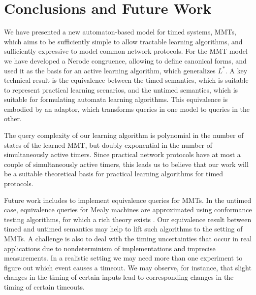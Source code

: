 
\section{Conclusions and Future Work}
\label{conclusions}

We have presented a new automaton-based model for timed systems, MMTs,
which aims to
be sufficiently simple to allow tractable learning algorithms, and sufficiently
expressive to model common network protocols. For the MMT model we have
developed a Nerode congruence, allowing to define canonical forms, and used it
as the basis for an active learning algorithm, which generalizes $L^*$.
A key technical result is the equivalence between the timed semantics,
which is suitable to represent practical learning scenarios, and the
untimed semantics, which is suitable for formulating automata learning
algorithms. This equivalence is embodied by an adaptor, which transforms
queries in one model to queries in the other.

The query complexity of our learning algorithm is polynomial in the number of
states of the learned MMT, but doubly exponential in the number of simultaneously
active timers. Since practical network protocols have at most a couple of
simultaneously active timers, this leads us to believe that our work will
be a suitable theoretical basis for practical learning algorithms for timed
protocols.

Future work includes to implement equivalence queries for MMTs.
In the untimed case, equivalence queries for Mealy machines are approximated using conformance testing algorithms,
for which a rich theory exists \cite{LeeY96}.
Our equivalence result between timed and untimed semantics may help to
lift such algorithms to the setting of MMTs.
A challenge is also to deal with the timing uncertainties that occur in real applications due to nondeterminism of
implementations and imprecise measurements. In a realistic
setting we may need more than one experiment to figure out which event causes a timeout. We may observe, for instance,
that slight changes in the timing of certain inputs lead to corresponding changes in the timing of certain timeouts.

